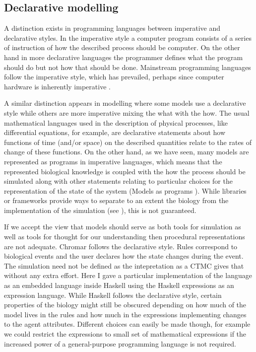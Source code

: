 \subsection{Declarative modelling}
A distinction exists in programming languages between imperative and declarative
styles. In the imperative style a computer program consists of a series of
instruction of how the described process should be computer. On the other hand
in more declarative languages the programmer defines what the program should do
but not how that should be done. Mainstream programming languages follow the
imperative style, which has prevailed, perhaps since computer hardware is
inherently imperative \citep{backus2007can}.

A similar distinction appears in modelling where some models use a declarative
style while others are more imperative mixing the what with the how. The usual
mathematical languages used in the description of physical processes, like
differential equations, for example, are declarative statements about how
functions of time (and/or space) on the described quantities relate to the rates
of change of these functions. On the other hand, as we have seen, many models
are represented as programs in imperative languages, which means that the
represented biological knowledge is coupled with the how the process should be
simulated along with other statements relating to particular choices for the
representation of the state of the system (Models as programs
). While libraries or frameworks provide ways to
separate to an extent the biology from the implementation of the simulation (see
), this is not guaranteed.

If we accept the view that models should serve as both tools for simulation as
well as tools for thought for our understanding then procedural representations
are not adequate. Chromar follows the declarative style. Rules correspond to
biological events and the user declares how the state changes during the
event. The simulation need not be defined as the intepretation as a CTMC gives
that without any extra effort. Here I gave a particular implementation of the
language as an embedded language inside Haskell using the Haskell expressions as
an expression language. While Haskell follows the declarative style, certain
properties of the biology might still be obscured depending on how much of the
model lives in the rules and how much in the expressions implementing changes to
the agent attributes. Different choices can easily be made though, for example
we could restrict the expressions to small set of mathematical expressions
\citep[perhaps a subset of MathML][]{ausbrooks2003mathematical} if the increased
power of a general-purpose programming language is not required.

